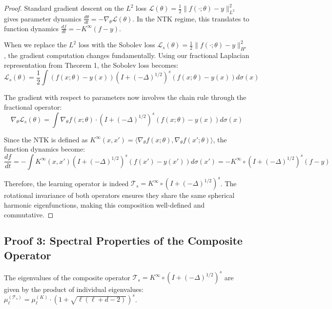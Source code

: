 \documentclass[a4paper]{article}
\begin{document}
\begin{proof}
Standard gradient descent on the $L^2$ loss $\mathcal{L}(\theta) = \frac{1}{2}\|f(\cdot; \theta) - y\|^2_{L^2}$ gives parameter dynamics $\frac{d\theta}{dt} = -\nabla_\theta \mathcal{L}(\theta)$. In the NTK regime, this translates to function dynamics $\frac{df}{dt} = -K^{\infty}(f - y)$.

When we replace the $L^2$ loss with the Sobolev loss $\mathcal{L}_s(\theta) = \frac{1}{2}\|f(\cdot; \theta) - y\|^2_{H^s}$, the gradient computation changes fundamentally. Using our fractional Laplacian representation from Theorem 1, the Sobolev loss becomes:
\[ \mathcal{L}_s(\theta) = \frac{1}{2}\int (f(x; \theta) - y(x)) (I + (-\Delta)^{1/2})^s (f(x; \theta) - y(x)) d\sigma(x) \]

The gradient with respect to parameters now involves the chain rule through the fractional operator:
\[ \nabla_\theta \mathcal{L}_s(\theta) = \int \nabla_\theta f(x; \theta) \cdot (I + (-\Delta)^{1/2})^s (f(x; \theta) - y(x)) d\sigma(x) \]

Since the NTK is defined as $K^{\infty}(x, x') = \langle \nabla_\theta f(x; \theta), \nabla_\theta f(x'; \theta) \rangle$, the function dynamics become:
\[ \frac{df}{dt} = -\int K^{\infty}(x, x') (I + (-\Delta)^{1/2})^s (f(x') - y(x')) d\sigma(x') = -K^{\infty} \circ (I + (-\Delta)^{1/2})^s (f - y) \]

Therefore, the learning operator is indeed $\mathcal{T}_s = K^{\infty} \circ (I + (-\Delta)^{1/2})^s$. The rotational invariance of both operators ensures they share the same spherical harmonic eigenfunctions, making this composition well-defined and commutative.
\end{proof}

\subsection{Proof 3: Spectral Properties of the Composite Operator}
\begin{theorem}
The eigenvalues of the composite operator $\mathcal{T}_s = K^{\infty} \circ (I + (-\Delta)^{1/2})^s$ are given by the product of individual eigenvalues: $\mu_\ell^{(\mathcal{T}_s)} = \mu_\ell^{(K)} \cdot (1 + \sqrt{\ell(\ell + d - 2)})^s$.
\end{theorem}
\end{document}

